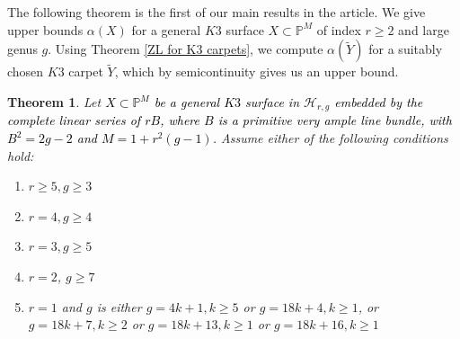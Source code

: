 \documentclass[11pt,twoside]{amsart}
\theoremstyle{plain}
\numberwithin{equation}{section}
\newtheorem{theorem}{Theorem}[section]
\theoremstyle{definition}
\begin{document}
The following theorem is the first of our main results in the article. We give upper bounds $\alpha(X)$ for a general $K3$ surface $X \subset \mathbb{P}^M$ of index $r \geq 2$ and large genus $g$. Using Theorem \ref{ZL for K3 carpets}, we compute $\alpha(\widetilde{Y})$ for a suitably chosen $K3$ carpet $\widetilde{Y}$, which by semicontinuity gives us an upper bound. 


\begin{theorem}\label{non-extendability of K3 surfaces}
    Let \textcolor{black}{$X \subset \mathbb{P}^{M}$ be a general $K3$ surface in $\mathcal{H}_{r,g}$ embedded by the complete linear series of $rB$, where $B$ is a primitive very ample line bundle, with $B^2 = 2g-2$ and $M = 1+r^2(g-1)$.} Assume either of the following conditions hold:
    \begin{enumerate}
        \item[(1)] $r \geq 5, g \geq 3$
        \item[(2)] $r = 4, g \geq 4$
        \item[(3)] $r = 3, g \geq 5$ 
        \item[(4)] $r = 2$, $g \geq 7$ 
        \item[(5)] $r = 1$ and $g$ is either $g = 4k+1, k \geq 5$ or $g = 18k+4, k \geq 1$, or $g = 18k+7, k \geq 2$ or $g = 18k+13, k \geq 1$ or $g = 18k+16, k \geq 1$
        
        
        
        
    \end{enumerate}
\end{theorem}
\end{document}
